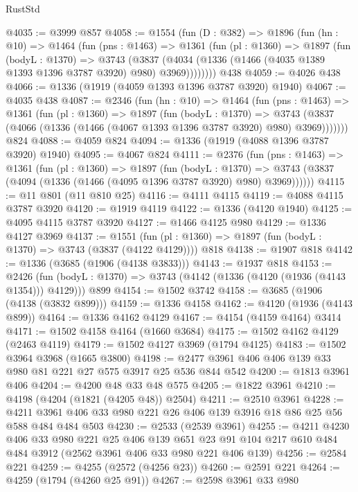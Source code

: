 \begin{lexlean}{RustStd}
\begin{coremodule}
{\begin{coremodule}
{{{{{{{{{{{{{{@4035 := @3999 @857
@4058 := @1554
    (fun (D : @382) =>
    @1896
      (fun (hn : @10) =>
      @1464
        (fun (pns : @1463) =>
        @1361
          (fun (pl : @1360) =>
          @1897
            (fun (bodyL : @1370) =>
            @3743
              (@3837 (@4034 (@1336 (@1466 (@4035 @1389 @1393 @1396 @3787 @3920) @980) @3969))))))))
    @438
@4059 := @4026 @438
@4066 := @1336 (@1919 (@4059 @1393 @1396 @3787 @3920) @1940)
@4067 := @4035 @438
@4087 := @2346
    (fun (hn : @10) =>
    @1464
      (fun (pns : @1463) =>
      @1361
        (fun (pl : @1360) =>
        @1897
          (fun (bodyL : @1370) =>
          @3743 (@3837 (@4066 (@1336 (@1466 (@4067 @1393 @1396 @3787 @3920) @980) @3969)))))))
    @824
@4088 := @4059 @824
@4094 := @1336 (@1919 (@4088 @1396 @3787 @3920) @1940)
@4095 := @4067 @824
@4111 := @2376
    (fun (pns : @1463) =>
    @1361
      (fun (pl : @1360) =>
      @1897
        (fun (bodyL : @1370) =>
        @3743 (@3837 (@4094 (@1336 (@1466 (@4095 @1396 @3787 @3920) @980) @3969))))))
@4115 := @11 @801 (@11 @810 @25)
@4116 := @4111 @4115
@4119 := @4088 @4115 @3787 @3920
@4120 := @1919 @4119
@4122 := @1336 (@4120 @1940)
@4125 := @4095 @4115 @3787 @3920
@4127 := @1466 @4125 @980
@4129 := @1336 @4127 @3969
@4137 := @1551 (fun (pl : @1360) => @1897 (fun (bodyL : @1370) => @3743 (@3837 (@4122 @4129)))) @818
@4138 := @1907 @818
@4142 := @1336 (@3685 (@1906 (@4138 @3833)))
@4143 := @1937 @818
@4153 := @2426
    (fun (bodyL : @1370) => @3743 (@4142 (@1336 (@4120 (@1936 (@4143 @1354))) @4129)))
    @899
@4154 := @1502 @3742
@4158 := @3685 (@1906 (@4138 (@3832 @899)))
@4159 := @1336 @4158
@4162 := @4120 (@1936 (@4143 @899))
@4164 := @1336 @4162 @4129
@4167 := @4154 (@4159 @4164) @3414
@4171 := @1502 @4158 @4164 (@1660 @3684)
@4175 := @1502 @4162 @4129 (@2463 @4119)
@4179 := @1502 @4127 @3969 (@1794 @4125)
@4183 := @1502 @3964 @3968 (@1665 @3800)
@4198 := @2477 @3961 @406 @406 @139 @33 @980 @81 @221 @27 @575 @3917 @25 @536 @844 @542
@4200 := @1813 @3961 @406
@4204 := @4200 @48 @33 @48 @575
@4205 := @1822 @3961
@4210 := @4198 (@4204 (@1821 (@4205 @48)) @2504)
@4211 := @2510 @3961
@4228 := @4211 @3961 @406 @33 @980 @221 @26 @406 @139 @3916 @18 @86 @25 @56 @588 @484 @484 @503
@4230 := @2533 (@2539 @3961)
@4255 := @4211
    @4230
    @406
    @33
    @980
    @221
    @25
    @406
    @139
    @651
    @23
    @91
    @104
    @217
    @610
    @484
    @484
    @3912
    (@2562 @3961 @406 @33 @980 @221 @406 @139)
@4256 := @2584 @221
@4259 := @4255 (@2572 (@4256 @23))
@4260 := @2591 @221
@4264 := @4259 (@1794 (@4260 @25 @91))
@4267 := @2598 @3961 @33 @980
}}}}}}}}}}}}}}
\end{coremodule}}
\end{coremodule}
\end{lexlean}
